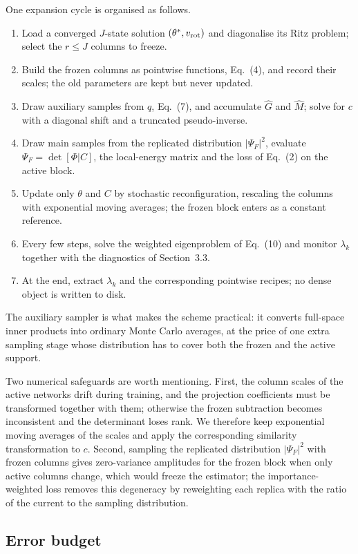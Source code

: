 \documentclass[10pt,a4paper]{article}
\begin{document}
One expansion cycle is organised as follows.
\begin{enumerate}[leftmargin=1.4em,itemsep=0pt,topsep=2pt,parsep=0pt]
\item Load a converged $J$-state solution $(\theta^*,v_{\rm rot})$ and diagonalise its Ritz problem; select the $r\le J$ columns to freeze.
\item Build the frozen columns as pointwise functions, Eq.~(4), and record their scales; the old parameters are kept but never updated.
\item Draw auxiliary samples from $q$, Eq.~(7), and accumulate $\hat G$ and $\hat M$; solve for $c$ with a diagonal shift and a truncated pseudo-inverse.
\item Draw main samples from the replicated distribution $|\Psi_F|^2$, evaluate $\Psi_F=\det[\Phi|C]$, the local-energy matrix and the loss of Eq.~(2) on the active block.
\item Update only $\theta$ and $C$ by stochastic reconfiguration, rescaling the columns with exponential moving averages; the frozen block enters as a constant reference.
\item Every few steps, solve the weighted eigenproblem of Eq.~(10) and monitor $\lambda_k$ together with the diagnostics of Section~3.3.
\item At the end, extract $\lambda_k$ and the corresponding pointwise recipes; no dense object is written to disk.
\end{enumerate}
The auxiliary sampler is what makes the scheme practical: it converts full-space inner products into ordinary Monte Carlo averages, at the price of one extra sampling stage whose distribution has to cover both the frozen and the active support.

Two numerical safeguards are worth mentioning. First, the column scales of the active networks drift during training, and the projection coefficients must be transformed together with them; otherwise the frozen subtraction becomes inconsistent and the determinant loses rank. We therefore keep exponential moving averages of the scales and apply the corresponding similarity transformation to $c$. Second, sampling the replicated distribution $|\Psi_F|^2$ with frozen columns gives zero-variance amplitudes for the frozen block when only active columns change, which would freeze the estimator; the importance-weighted loss removes this degeneracy by reweighting each replica with the ratio of the current to the sampling distribution.

\subsection{Error budget}
\end{document}
